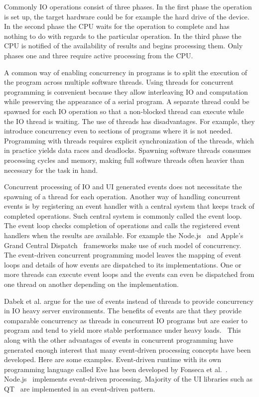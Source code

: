 Commonly IO operations consist of three phases. In the first phase the operation is set up, the target hardware could be for example the hard drive of the device. In the second phase the CPU waits for the operation to complete and has nothing to do with regards to the particular operation. In the third phase the CPU is notified of the availability of results and begins processing them. Only phases one and three require active processing from the CPU.~\cite{friesen2015asynchronous}

A common way of enabling concurrency in programs is to split the execution of the program across multiple software threads. Using threads for concurrent programming is convenient because they allow interleaving IO and computation while preserving the appearance of a serial program. A separate thread could be spawned for each IO operation so that a non-blocked thread can execute while the IO thread is waiting. The use of threads has disadvantages. For example, they introduce concurrency even to sections of programs where it is not needed. Programming with threads requires explicit synchronization of the threads, which in practice yields data races and deadlocks. Spawning software threads consumes processing cycles and memory, making full software threads often heavier than necessary for the task in hand.~\cite{dabek2002event, lee2006problem}

Concurrent processing of IO and UI generated events does not necessitate the spawning of a thread for each operation. Another way of handling concurrent events is by registering an event handler with a central system that keeps track of completed operations. Such central system is commonly called the event loop. The event loop checks completion of operations and calls the registered event handlers when the results are available. For example the Node.js~\cite{tilkov2010node} and Apple's Grand Central Dispatch~\cite{sakamoto2012grand} frameworks make use of such model of concurrency. The event-driven concurrent programming model leaves the mapping of event loops and details of how events are dispatched to its implementations. One or more threads can execute event loops and the events can even be dispatched from one thread on another depending on the implementation.

Dabek et al. argue for the use of events instead of threads to provide concurrency in IO heavy server environments. The benefits of events are that they provide comparable concurrency as threads in concurrent IO programs but are easier to program and tend to yield more stable performance under heavy loads.~\cite{dabek2002event} This along with the other advantages of events in concurrent programming have generated enough interest that many event-driven processing concepts have been developed. Here are some examples. Event-driven runtime with its own programming language called Eve has been developed by Fonseca et al.~\cite{fonseca2014eve}. Node.js~\cite{tilkov2010node} implements event-driven processing. Majority of the UI libraries such as QT~\cite{blanchette2006cpp} are implemented in an event-driven pattern.
